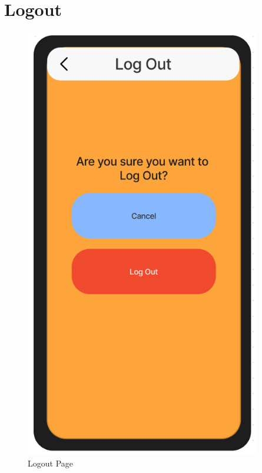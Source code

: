 \documentclass[title page]{article}
\begin{document}
\section{Logout}
\begin{figure}[!h]
    \begin{center}
          \includegraphics[height=19cm]{images/logout.png}
          \caption{Logout Page}
          \label{fig:logout}
    \end{center}
\end{figure}
\end{document}
